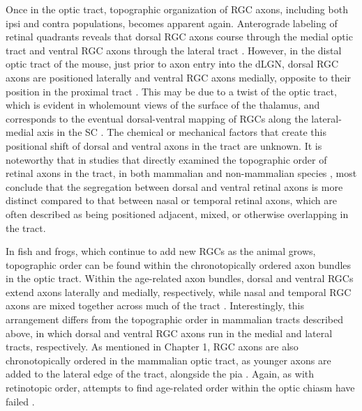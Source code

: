 Once in the optic tract, topographic organization of RGC axons, including both ipsi and contra populations, becomes apparent again.
Anterograde labeling of retinal quadrants reveals that dorsal RGC axons course through the medial optic tract and ventral RGC axons through the lateral tract \cite{torrealba1982studies,reh1983organization,reese1990fibre,reese1993reestablishment,chan1994changes,chan1999changes,plas2005pretarget}.%
However, in the distal optic tract of the mouse, just prior to axon entry into the dLGN, dorsal RGC axons are positioned laterally and ventral RGC axons medially, opposite to their position in the proximal tract \cite{plas2005pretarget}. %
This may be due to a twist of the optic tract, which is evident in wholemount views of the surface of the thalamus, and corresponds to the eventual dorsal-ventral mapping of RGCs along the lateral-medial axis in the SC \cite{plas2005pretarget}.
The chemical or mechanical factors that create this positional shift of dorsal and ventral axons in the tract are unknown.
It is noteworthy that in studies that directly examined the topographic order of retinal axons in the tract, in both mammalian \cite{reese1993reestablishment,chan1994changes,plas2005pretarget} and non-mammalian species \cite{reh1983organization,thanos1983investigations,ehrlich1984course,montgomery1998organization}, most conclude that the segregation between dorsal and ventral retinal axons is more distinct compared to that between nasal or temporal retinal axons, which are often described as being positioned adjacent, mixed, or otherwise overlapping in the tract.

In fish and frogs, which continue to add new RGCs as the animal grows, topographic order can be found within the chronotopically ordered axon bundles in the optic tract.
Within the age-related axon bundles, dorsal and ventral RGCs extend axons laterally and medially, respectively, while nasal and temporal RGC axons are mixed together across much of the tract \cite{reh1983organization}.
Interestingly, this arrangement differs from the topographic order in mammalian tracts described above, in which dorsal and ventral RGC axons run in the medial and lateral tracts, respectively.
As mentioned in Chapter 1, RGC axons are also chronotopically ordered in the mammalian optic tract, as younger axons are added to the lateral edge of the tract, alongside the pia \cite{walsh1985age,reese1987distributionrat,reese1990fibre,colello1992observations,reese1997chronotopic}. %
Again, as with retinotopic order, attempts to find age-related order within the optic chiasm have failed \cite{colello1998changing}.
